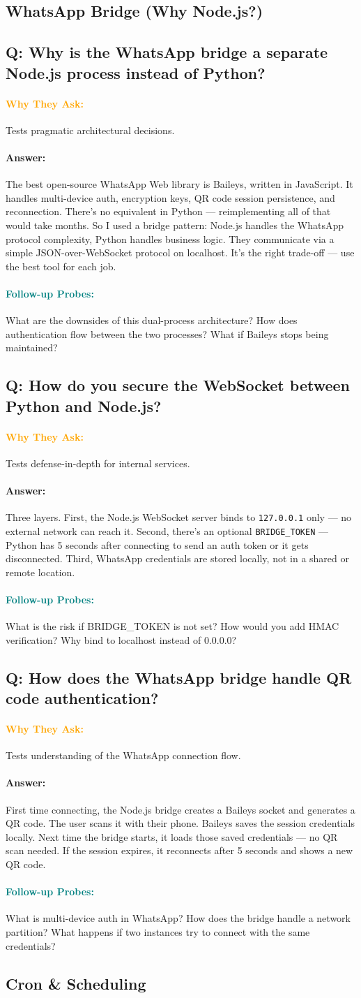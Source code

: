 \documentclass[11pt,a4paper]{article}
\newcommand{\Q}[1]{\subsection{#1}}
\newcommand{\Ans}[1]{\paragraph{\textbf{Answer:}} #1}
\newcommand{\Why}{\paragraph{\textcolor{orange}{\textbf{Why They Ask:}}}}
\newcommand{\Probe}{\paragraph{\textcolor{teal}{\textbf{Follow-up Probes:}}}}
\begin{document}
\subsection{WhatsApp Bridge (Why Node.js?)}

\Q{Q: Why is the WhatsApp bridge a separate Node.js process instead of Python?}
\Why Tests pragmatic architectural decisions.
\Ans The best open-source WhatsApp Web library is Baileys, written in JavaScript. It handles multi-device auth, encryption keys, QR code session persistence, and reconnection. There's no equivalent in Python --- reimplementing all of that would take months. So I used a bridge pattern: Node.js handles the WhatsApp protocol complexity, Python handles business logic. They communicate via a simple JSON-over-WebSocket protocol on localhost. It's the right trade-off --- use the best tool for each job.
\Probe What are the downsides of this dual-process architecture? How does authentication flow between the two processes? What if Baileys stops being maintained?

\Q{Q: How do you secure the WebSocket between Python and Node.js?}
\Why Tests defense-in-depth for internal services.
\Ans Three layers. First, the Node.js WebSocket server binds to \texttt{127.0.0.1} only --- no external network can reach it. Second, there's an optional \texttt{BRIDGE\_TOKEN} --- Python has 5 seconds after connecting to send an auth token or it gets disconnected. Third, WhatsApp credentials are stored locally, not in a shared or remote location.
\Probe What is the risk if BRIDGE\_TOKEN is not set? How would you add HMAC verification? Why bind to localhost instead of 0.0.0.0?

\Q{Q: How does the WhatsApp bridge handle QR code authentication?}
\Why Tests understanding of the WhatsApp connection flow.
\Ans First time connecting, the Node.js bridge creates a Baileys socket and generates a QR code. The user scans it with their phone. Baileys saves the session credentials locally. Next time the bridge starts, it loads those saved credentials --- no QR scan needed. If the session expires, it reconnects after 5 seconds and shows a new QR code.
\Probe What is multi-device auth in WhatsApp? How does the bridge handle a network partition? What happens if two instances try to connect with the same credentials?

\subsection{Cron \& Scheduling}
\end{document}
